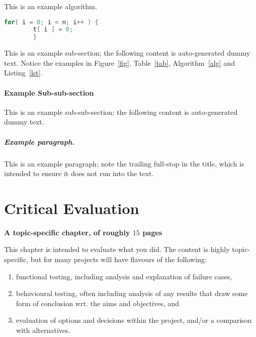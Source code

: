 \documentclass[
author={Veyndan Stuart},
supervisor={Prof. Dave Cliff},
degree={MEng},
title={Some Structural Guidelines for CS MEng Dissertations},
subtitle={},
type={enterprise},
year={2019}
]{thesis}
\begin{document}
    \begin{algorithm}[t]
        \caption{This is an example algorithm.}
        \label{alg}
    \end{algorithm}

    \begin{lstlisting}[float={t},caption={This is an example listing.},label={lst},language=C]
        for( i = 0; i < n; i++ ) {
        t[ i ] = 0;
        }
    \end{lstlisting}

    This is an example sub-section;
    the following content is auto-generated dummy text.
    Notice the examples in Figure~\ref{fig}, Table~\ref{tab}, Algorithm~\ref{alg}
    and Listing~\ref{lst}.
    \lipsum

    \subsubsection{Example Sub-sub-section}

    This is an example sub-sub-section;
    the following content is auto-generated dummy text.
    \lipsum

    \paragraph{Example paragraph.}

    This is an example paragraph; note the trailing full-stop in the title,
    which is intended to ensure it does not run into the text.


    \chapter{Critical Evaluation}
    \label{chap:evaluation}

    {\bf A topic-specific chapter, of roughly $15$ pages}
    \vspace{1cm}

    \noindent
    This chapter is intended to evaluate what you did. The content is highly
    topic-specific, but for many projects will have flavours of the following:

    \begin{enumerate}
        \item functional testing, including analysis and explanation of failure
        cases,
        \item behavioural testing, often including analysis of any results that
        draw some form of conclusion wrt. the aims and objectives,
        and
        \item evaluation of options and decisions within the project, and/or a
        comparison with alternatives.
    \end{enumerate}
\end{document}
